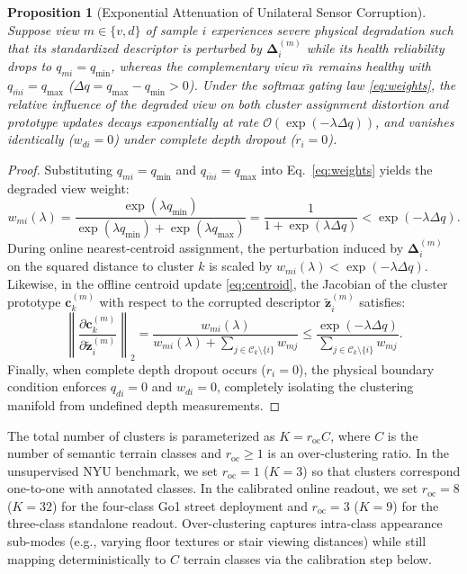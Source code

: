 \documentclass[11pt, a4paper]{article}
\newtheorem{proposition}{Proposition}
\begin{document}
\begin{proposition}[Exponential Attenuation of Unilateral Sensor Corruption]
\label{prop:robustness}
Suppose view $m \in \{v, d\}$ of sample $i$ experiences severe physical degradation such that its standardized descriptor is perturbed by $\bm{\Delta}_i^{(m)}$ while its health reliability drops to $q_{mi} = q_{\min}$, whereas the complementary view $\bar{m}$ remains healthy with $q_{\bar{m}i} = q_{\max}$ ($\Delta q = q_{\max} - q_{\min} > 0$). Under the softmax gating law \eqref{eq:weights}, the relative influence of the degraded view on both cluster assignment distortion and prototype updates decays exponentially at rate $\mathcal{O}(\exp(-\lambda \Delta q))$, and vanishes identically ($w_{di}=0$) under complete depth dropout ($r_i = 0$).
\end{proposition}
\begin{proof}
Substituting $q_{mi} = q_{\min}$ and $q_{\bar{m}i} = q_{\max}$ into Eq.~\eqref{eq:weights} yields the degraded view weight:
\begin{equation}
w_{mi}(\lambda) = \frac{\exp(\lambda q_{\min})}{\exp(\lambda q_{\min}) + \exp(\lambda q_{\max})} = \frac{1}{1 + \exp(\lambda \Delta q)} < \exp(-\lambda \Delta q).
\end{equation}
During online nearest-centroid assignment, the perturbation induced by $\bm{\Delta}_i^{(m)}$ on the squared distance to cluster $k$ is scaled by $w_{mi}(\lambda) < \exp(-\lambda \Delta q)$. Likewise, in the offline centroid update \eqref{eq:centroid}, the Jacobian of the cluster prototype $\mathbf{c}_k^{(m)}$ with respect to the corrupted descriptor $\tilde{\mathbf{z}}_i^{(m)}$ satisfies:
\begin{equation}
\left\| \frac{\partial \mathbf{c}_k^{(m)}}{\partial \tilde{\mathbf{z}}_i^{(m)}} \right\|_2 = \frac{w_{mi}(\lambda)}{w_{mi}(\lambda) + \sum_{j \in \mathcal{C}_k \setminus \{i\}} w_{mj}} \le \frac{\exp(-\lambda \Delta q)}{\sum_{j \in \mathcal{C}_k \setminus \{i\}} w_{mj}}.
\end{equation}
Finally, when complete depth dropout occurs ($r_i = 0$), the physical boundary condition enforces $q_{di} = 0$ and $w_{di} = 0$, completely isolating the clustering manifold from undefined depth measurements.
\end{proof}

The total number of clusters is parameterized as $K = r_{\text{oc}} C$, where $C$ is the number of semantic terrain classes and $r_{\text{oc}} \ge 1$ is an over-clustering ratio. In the unsupervised NYU benchmark, we set $r_{\text{oc}}=1$ ($K=3$) so that clusters correspond one-to-one with annotated classes. In the calibrated online readout, we set $r_{\text{oc}}=8$ ($K=32$) for the four-class Go1 street deployment and $r_{\text{oc}}=3$ ($K=9$) for the three-class standalone readout. Over-clustering captures intra-class appearance sub-modes (e.g., varying floor textures or stair viewing distances) while still mapping deterministically to $C$ terrain classes via the calibration step below.
\end{document}
